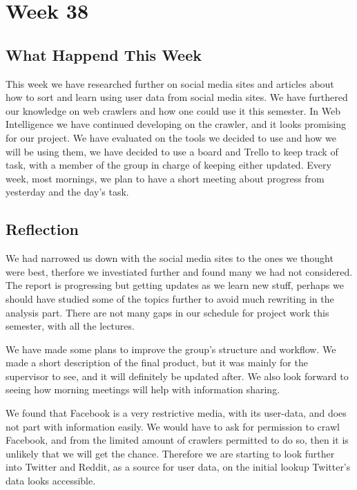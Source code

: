 \section*{Week 38} \subsection*{What Happend This Week} 
This week we have researched further on social media sites and articles about
how to sort and learn using user data from social media sites. We have furthered
our knowledge on web crawlers and how one could use it this semester. In Web
Intelligence we have continued developing on the crawler, and it looks promising
for our project. We have evaluated on the tools we decided to use and how we
will be using them, we have decided to use a board and Trello to keep track of
task, with a member of the group in charge of keeping either updated. Every
week, most mornings, we plan to have a short meeting about progress from
yesterday and the day's task.


\subsection*{Reflection}
We had narrowed us down with the social media sites to the ones we thought were
best, therfore we investiated further and found many we had not considered. The
report is progressing but getting updates as we learn new stuff, perhaps we
should have studied some of the topics further to avoid much rewriting in the
analysis part. There are not many gaps in our schedule for project work this
semester, with all the lectures.

We have made some plans to improve the group's structure and workflow. We made a
short description of the final product, but it was mainly for the supervisor to
see, and it will definitely be updated after. We also look forward to seeing how
morning meetings will help with information sharing.

We found that Facebook is a very restrictive media, with its user-data, and does
not part with information easily. We would have to ask for permission to crawl
Facebook, and from the limited amount of crawlers permitted to do so, then it is
unlikely that we will get the chance. Therefore we are starting to look further into
Twitter and Reddit, as a source for user data, on the initial lookup Twitter's
data looks accessible.

